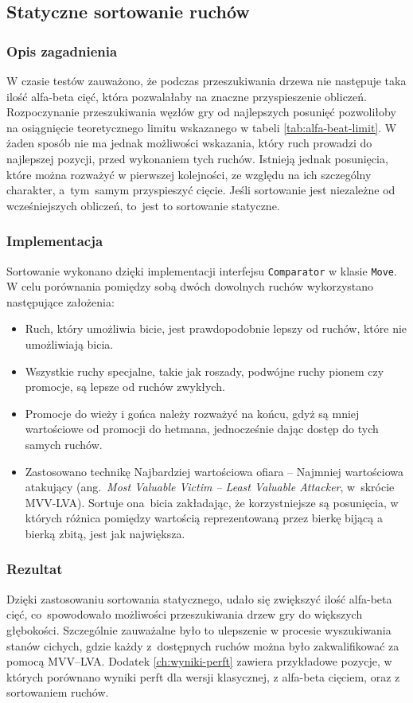 \subsection{Statyczne sortowanie ruchów}
\label{subsec:sortowanie-ruchow}

\subsubsection{Opis zagadnienia}
W czasie testów zauważono, że podczas przeszukiwania drzewa nie następuje taka ilość alfa-beta cięć, która pozwalałaby na znaczne przyspieszenie obliczeń.
Rozpoczynanie przeszukiwania węzłów gry od najlepszych posunięć pozwoliłoby na osiągnięcie teoretycznego limitu wskazanego w tabeli \ref{tab:alfa-beat-limit}.
W żaden sposób nie ma jednak możliwości wskazania, który ruch prowadzi do najlepszej pozycji, przed wykonaniem tych ruchów.
Istnieją jednak posunięcia, które można rozważyć w pierwszej kolejności, ze względu na ich szczególny charakter, a~tym~samym przyspieszyć cięcie.
Jeśli sortowanie jest niezależne od wcześniejszych obliczeń, to~jest to sortowanie statyczne.

\subsubsection{Implementacja}
Sortowanie wykonano dzięki implementacji interfejsu \texttt{Comparator} w klasie \texttt{Move}.
W celu porównania pomiędzy sobą dwóch dowolnych ruchów wykorzystano następujące założenia:
\begin{itemize}
    \item Ruch, który umożliwia bicie, jest prawdopodobnie lepszy od ruchów, które nie umożliwiają bicia.
    \item Wszystkie ruchy specjalne, takie jak roszady, podwójne ruchy pionem czy promocje, są lepsze od ruchów zwykłych.
    \item Promocje do wieży i gońca należy rozważyć na końcu, gdyż są mniej wartościowe od promocji do hetmana, jednocześnie dając dostęp do tych samych ruchów.
    \item Zastosowano technikę Najbardziej wartościowa ofiara – Najmniej wartościowa atakujący (ang.~\emph{Most Valuable Victim – Least Valuable Attacker}, w~skrócie MVV-LVA). Sortuje ona~bicia zakładając, że korzystniejsze są posunięcia, w których różnica pomiędzy wartością reprezentowaną przez bierkę bijącą a bierką zbitą, jest jak największa.
\end{itemize}

\subsubsection{Rezultat}
Dzięki zastosowaniu sortowania statycznego, udało się zwiększyć ilość alfa-beta cięć, co~spowodowało możliwości przeszukiwania drzew gry do większych głębokości.
Szczególnie zauważalne było to ulepszenie w procesie wyszukiwania stanów cichych, gdzie każdy z~dostępnych ruchów można było zakwalifikować za pomocą MVV–LVA.
Dodatek \ref{ch:wyniki-perft} zawiera przykładowe pozycje, w których porównano wyniki perft dla wersji klasycznej, z alfa-beta cięciem, oraz z sortowaniem ruchów.